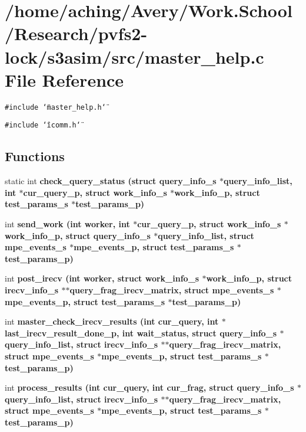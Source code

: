 \section{/home/aching/Avery/Work.School/Research/pvfs2-lock/s3asim/src/master\_\-help.c File Reference}
\label{master__help_8c}
{\tt \#include \char`\"{}master\_\-help.h\char`\"{}}\par
{\tt \#include \char`\"{}icomm.h\char`\"{}}\par
\subsection*{Functions}
\begin{CompactItemize}
\item 
static int \bf{check\_\-query\_\-status} (struct \bf{query\_\-info\_\-s} $\ast$query\_\-info\_\-list, int $\ast$cur\_\-query\_\-p, struct \bf{work\_\-info\_\-s} $\ast$work\_\-info\_\-p, struct \bf{test\_\-params\_\-s} $\ast$test\_\-params\_\-p)
\item 
int \bf{send\_\-work} (int worker, int $\ast$cur\_\-query\_\-p, struct \bf{work\_\-info\_\-s} $\ast$work\_\-info\_\-p, struct \bf{query\_\-info\_\-s} $\ast$query\_\-info\_\-list, struct \bf{mpe\_\-events\_\-s} $\ast$mpe\_\-events\_\-p, struct \bf{test\_\-params\_\-s} $\ast$test\_\-params\_\-p)
\item 
int \bf{post\_\-irecv} (int worker, struct \bf{work\_\-info\_\-s} $\ast$work\_\-info\_\-p, struct \bf{irecv\_\-info\_\-s} $\ast$$\ast$query\_\-frag\_\-irecv\_\-matrix, struct \bf{mpe\_\-events\_\-s} $\ast$mpe\_\-events\_\-p, struct \bf{test\_\-params\_\-s} $\ast$test\_\-params\_\-p)
\item 
int \bf{master\_\-check\_\-irecv\_\-results} (int cur\_\-query, int $\ast$last\_\-irecv\_\-result\_\-done\_\-p, int wait\_\-status, struct \bf{query\_\-info\_\-s} $\ast$query\_\-info\_\-list, struct \bf{irecv\_\-info\_\-s} $\ast$$\ast$query\_\-frag\_\-irecv\_\-matrix, struct \bf{mpe\_\-events\_\-s} $\ast$mpe\_\-events\_\-p, struct \bf{test\_\-params\_\-s} $\ast$test\_\-params\_\-p)
\item 
int \bf{process\_\-results} (int cur\_\-query, int cur\_\-frag, struct \bf{query\_\-info\_\-s} $\ast$query\_\-info\_\-list, struct \bf{irecv\_\-info\_\-s} $\ast$$\ast$query\_\-frag\_\-irecv\_\-matrix, struct \bf{mpe\_\-events\_\-s} $\ast$mpe\_\-events\_\-p, struct \bf{test\_\-params\_\-s} $\ast$test\_\-params\_\-p)
$$
\end{CompactItemize}
